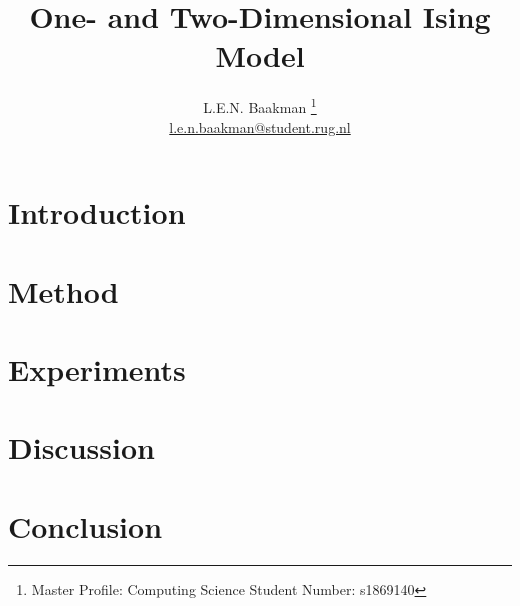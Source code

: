 \documentclass[oneside, a4paper, twocolumn, reqno, fleqn, 11pt]{article}
\title{\sc One- and Two-Dimensional Ising Model}
\author{L.E.N. Baakman%
	\thanks{%
		Master Profile: Computing Science\newline
	 	\hspace*{14pt} Student Number: s1869140%
	}\\%
	\href{mailto:l.e.n.baakman@student.rug.nl}{l.e.n.baakman@student.rug.nl}
}
\begin{document}
\maketitle

\section{Introduction}
\label{s:intro}


\section{Method}
\label{s:method}
	

\section{Experiments}
\label{s:experiment}
	

\section{Discussion}
\label{s:discussion}


\section{Conclusion}
\label{s:conclusion}


\printbibliography
\end{document}
